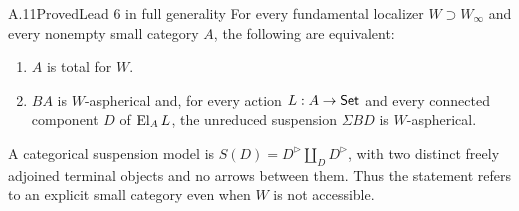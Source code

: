 \begin{claim}{A.11}{Proved}{Lead 6 in full generality}\label{A:suspension-criterion}
For every fundamental localizer $W\supset W_\infty$ and every nonempty small category $A$, the following are equivalent:
\begin{enumerate}
\item $A$ is total for $W$.
\item $BA$ is $W$-aspherical and, for every action $L:A\to\mathsf{Set}$ and every connected component $D$ of $\operatorname{El}_A L$, the unreduced suspension $\Sigma BD$ is $W$-aspherical.
\end{enumerate}
A categorical suspension model is $S(D)=D^{\triangleright}\amalg_D D^{\triangleright}$, with two distinct freely adjoined terminal objects and no arrows between them. Thus the statement refers to an explicit small category even when $W$ is not accessible.
\end{claim}
